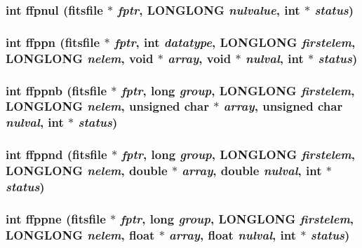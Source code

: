 \subsubsection{\setlength{\rightskip}{0pt plus 5cm}int ffpnul (\bf{fitsfile} $\ast$ {\em fptr}, \bf{LONGLONG} {\em nulvalue}, int $\ast$ {\em status})}\label{fitsio_8h_611f557254bffac18cb113388849944a}


\subsubsection{\setlength{\rightskip}{0pt plus 5cm}int ffppn (\bf{fitsfile} $\ast$ {\em fptr}, int {\em datatype}, \bf{LONGLONG} {\em firstelem}, \bf{LONGLONG} {\em nelem}, void $\ast$ {\em array}, void $\ast$ {\em nulval}, int $\ast$ {\em status})}\label{fitsio_8h_03027451cf6719b0ff4ffb8c6659b2a2}


\subsubsection{\setlength{\rightskip}{0pt plus 5cm}int ffppnb (\bf{fitsfile} $\ast$ {\em fptr}, long {\em group}, \bf{LONGLONG} {\em firstelem}, \bf{LONGLONG} {\em nelem}, unsigned char $\ast$ {\em array}, unsigned char {\em nulval}, int $\ast$ {\em status})}\label{fitsio_8h_38152248c04b8b4ff9f813cd636013a4}


\subsubsection{\setlength{\rightskip}{0pt plus 5cm}int ffppnd (\bf{fitsfile} $\ast$ {\em fptr}, long {\em group}, \bf{LONGLONG} {\em firstelem}, \bf{LONGLONG} {\em nelem}, double $\ast$ {\em array}, double {\em nulval}, int $\ast$ {\em status})}\label{fitsio_8h_dbce44e4863160818dafc8a7e74df364}


\subsubsection{\setlength{\rightskip}{0pt plus 5cm}int ffppne (\bf{fitsfile} $\ast$ {\em fptr}, long {\em group}, \bf{LONGLONG} {\em firstelem}, \bf{LONGLONG} {\em nelem}, float $\ast$ {\em array}, float {\em nulval}, int $\ast$ {\em status})}\label{fitsio_8h_01aa3f24254f8d3895463d830679fc52}


